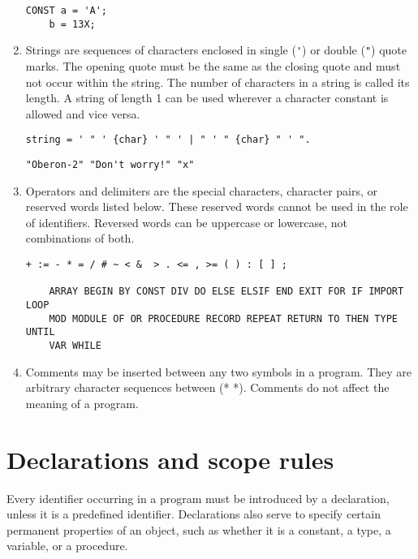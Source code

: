\documentclass[12pt]{article}
\begin{document}
\begin{enumerate}
\begin{lstlisting}[style=example]
CONST a = 'A';
    b = 13X;
\end{lstlisting} 

\item Strings are sequences of characters enclosed in single (\lstinline!'!) or double (\lstinline!"!) quote marks. The opening quote must be the same as the closing quote and must not occur within the string. The number of characters in a string is called its length. A string of length 1 can be used wherever a character constant is allowed and vice versa.

\begin{lstlisting}[style=ebnf]
    string = ' " ' {char} ' " ' | " ' " {char} " ' ".
\end{lstlisting}

\begin{lstlisting}[style=example]
"Oberon-2" "Don't worry!" "x"
\end{lstlisting} 

\item Operators and delimiters are the special characters, character pairs, or reserved words listed below. These reserved words  cannot be used in the role of identifiers. Reversed words can be uppercase or lowercase, not combinations of both. 

\begin{lstlisting}[style=example]
    + := - * = / # ~ < &  > . <= , >= ( ) : [ ] ; 
    
    ARRAY BEGIN BY CONST DIV DO ELSE ELSIF END EXIT FOR IF IMPORT LOOP
    MOD MODULE OF OR PROCEDURE RECORD REPEAT RETURN TO THEN TYPE UNTIL
    VAR WHILE
\end{lstlisting}

\item Comments may be inserted between any two symbols in a program. They are arbitrary character sequences between (* *). 
Comments do not affect the meaning of a program.

\end{enumerate}

\section{Declarations and scope rules}
\label{declarations}

Every identifier occurring in a program must be introduced by a declaration, unless it is a predefined identifier. Declarations also serve to specify certain permanent properties of an object, such as whether it is a constant, a type, a variable, or a procedure.
\end{document}
